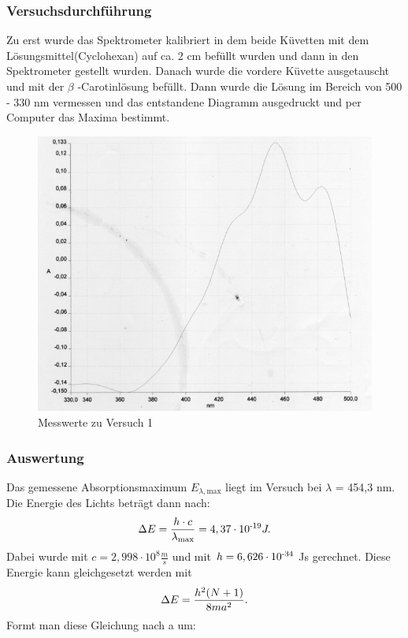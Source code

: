 \documentclass{scrartcl}
\begin{document}
\subsubsection{Versuchsdurchführung}
Zu erst wurde das Spektrometer kalibriert in dem beide Küvetten mit dem Lösungsmittel(Cyclohexan) auf ca. 2 cm befüllt wurden und dann in den Spektrometer gestellt wurden. Danach wurde die vordere Küvette ausgetauscht und mit der $\beta$ -Carotinlösung befüllt. Dann wurde die Lösung im Bereich von 500 - 330 nm vermessen und das entstandene Diagramm ausgedruckt und per Computer das Maxima bestimmt.
\begin{figure}[h]
	\centering
	\caption{Messwerte zu Versuch 1}
	\includegraphics[scale=.5]{Kurve1.png}
\end{figure}
\subsubsection{Auswertung}
Das gemessene Absorptionsmaximum $E_{\lambda,\text{max}}$ liegt im Versuch bei  $\lambda$ = 454,3 nm. Die Energie des Lichts beträgt dann nach:
\begin{equation*}
\Delta E = \frac{h\cdot c}{\lambda \textsubscript{max}} = 4,37\cdot 10\textsuperscript{-19}J.
\end{equation*}
Dabei wurde mit $c= 2,998\cdot 10^8 \frac{m}{s}$ und mit $h = 6,626\cdot 10\textsuperscript{-34}$ Js gerechnet. Diese Energie kann gleichgesetzt werden mit
\begin{equation*}
\Delta E = \frac{h\textsuperscript{2} (N+1)}{8 m a\textsuperscript{2}}.
\end{equation*}
\newpage
Formt man diese Gleichung nach a um:
\end{document}
